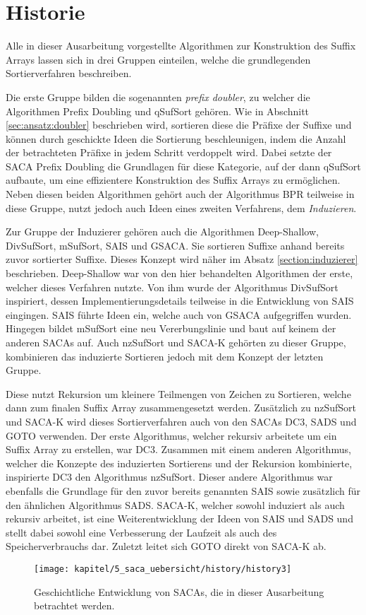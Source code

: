 \section{Historie}
Alle  in dieser Ausarbeitung vorgestellte Algorithmen zur Konstruktion des Suffix Arrays lassen sich in drei Gruppen einteilen, welche die grundlegenden Sortierverfahren beschreiben. \par
Die erste Gruppe bilden die sogenannten \textit{prefix doubler}, zu welcher die Algorithmen Prefix Doubling und qSufSort gehören.
Wie in Abschnitt \ref{sec:ansatz:doubler} beschrieben wird, sortieren diese die Präfixe der Suffixe und können durch geschickte Ideen die Sortierung beschleunigen, indem die Anzahl der betrachteten Präfixe in jedem Schritt verdoppelt wird. 
Dabei setzte der SACA Prefix Doubling die Grundlagen für diese Kategorie, auf der dann qSufSort aufbaute, um eine effizientere Konstruktion des Suffix Arrays zu ermöglichen. 
Neben diesen beiden Algorithmen gehört auch der Algorithmus BPR teilweise in diese Gruppe, nutzt jedoch auch Ideen eines zweiten Verfahrens, dem \textit{Induzieren}. \par

Zur Gruppe der Induzierer gehören auch die Algorithmen Deep-Shallow, DivSufSort, mSufSort, SAIS und GSACA.
Sie sortieren Suffixe anhand bereits zuvor sortierter Suffixe.
Dieses Konzept wird näher im Absatz \ref{section:induzierer} beschrieben.
Deep-Shallow war von den hier behandelten Algorithmen der erste, welcher dieses Verfahren nutzte.
Von ihm wurde der Algorithmus DivSufSort inspiriert, dessen Implementierungsdetails teilweise in die Entwicklung von SAIS eingingen.
SAIS führte Ideen ein, welche auch von GSACA aufgegriffen wurden.
Hingegen bildet mSufSort eine neu Vererbungslinie und baut auf keinem der anderen SACAs auf.
Auch nzSufSort und SACA-K gehörten zu dieser Gruppe, kombinieren das induzierte Sortieren jedoch mit dem Konzept der letzten Gruppe. \par

Diese nutzt Rekursion um kleinere Teilmengen von Zeichen zu Sortieren, welche dann zum finalen Suffix Array zusammengesetzt werden.
Zusätzlich zu nzSufSort und SACA-K wird dieses Sortierverfahren auch von den SACAs DC3, SADS und GOTO verwenden. 
Der erste Algorithmus, welcher rekursiv arbeitete um ein Suffix Array zu erstellen, war DC3. 
Zusammen mit einem anderen Algorithmus, welcher die Konzepte des induzierten Sortierens und der Rekursion kombinierte, inspirierte DC3 den Algorithmus nzSufSort. 
Dieser andere Algorithmus war ebenfalls die Grundlage für den zuvor bereits genannten SAIS sowie zusätzlich für den ähnlichen Algorithmus SADS.
SACA-K, welcher sowohl induziert als auch rekursiv arbeitet, ist eine Weiterentwicklung der Ideen von SAIS und SADS und stellt dabei sowohl eine Verbesserung der Laufzeit als auch des Speicherverbrauchs dar.
Zuletzt leitet sich GOTO direkt von SACA-K ab. \par

\begin{figure}[H]
	\centering
	\texttt{[image: kapitel/5\_saca\_uebersicht/history/history3]}
	\caption{Geschichtliche Entwicklung von SACAs, die in dieser Ausarbeitung betrachtet werden.}
	\label{fig_banane_1_2}
\end{figure}
